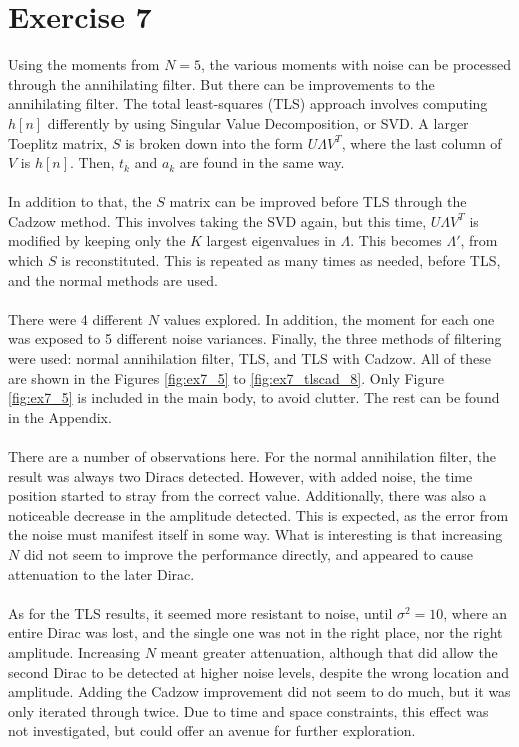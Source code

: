 \documentclass[11pt,a4paper]{report}
\newcommand{\mychapter}[2]
{
    \setcounter{chapter}{#1}
    \setcounter{section}{0}
    \chapter*{#2}
    \addcontentsline{toc}{chapter}{#2}
}
\begin{document}
\mychapter{7}{Exercise 7}
Using the moments from $N = 5$, the various moments with noise can be processed through the annihilating filter. But there can be improvements to the annihilating filter. The total least-squares (TLS) approach involves computing $h[n]$ differently by using Singular Value Decomposition, or SVD. A larger Toeplitz matrix, $S$ is broken down into the form $U\Lambda V^T$, where the last column of $V$ is $h[n]$. Then, $t_k$ and $a_k$ are found in the same way.
\\\\
In addition to that, the $S$ matrix can be improved before TLS through the Cadzow method. This involves taking the SVD again, but this time, $U\Lambda V^T$ is modified by keeping only the $K$ largest eigenvalues in $\Lambda$. This becomes $\Lambda'$, from which $S$ is reconstituted. This is repeated as many times as needed, before TLS, and the normal methods are used.
\\\\
There were 4 different $N$ values explored. In addition, the moment for each one was exposed to 5 different noise variances. Finally, the three methods of filtering were used: normal annihilation filter, TLS, and TLS with Cadzow. All of these are shown in the Figures \ref{fig:ex7_5} to \ref{fig:ex7_tlscad_8}. Only Figure \ref{fig:ex7_5} is included in the main body, to avoid clutter. The rest can be found in the Appendix.
\\\\
There are a number of observations here. For the normal annihilation filter, the result was always two Diracs detected. However, with added noise, the time position started to stray from the correct value. Additionally, there was also a noticeable decrease in the amplitude detected. This is expected, as the error from the noise must manifest itself in some way. What is interesting is that increasing $N$ did not seem to improve the performance directly, and appeared to cause attenuation to the later Dirac.
\\\\
As for the TLS results, it seemed more resistant to noise, until $\sigma^2 = 10$, where an entire Dirac was lost, and the single one was not in the right place, nor the right amplitude. Increasing $N$ meant greater attenuation, although that did allow the second Dirac to be detected at higher noise levels, despite the wrong location and amplitude. Adding the Cadzow improvement did not seem to do much, but it was only iterated through twice. Due to time and space constraints, this effect was not investigated, but could offer an avenue for further exploration.
\end{document}

